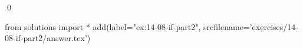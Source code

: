 
\begin{ex}
  \label{ex:14-08-if-part2}
  
  \qed
\end{ex}
\begin{python0}
from solutions import *
add(label="ex:14-08-if-part2",
    srcfilename='exercises/14-08-if-part2/answer.tex')
\end{python0}

